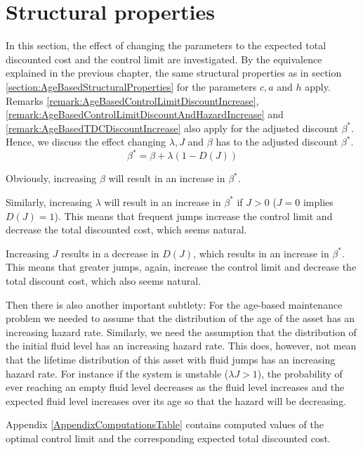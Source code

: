 \section{Structural properties}\label{section:SimpleStructuralProperties}
In this section, the effect of changing the parameters to the expected total discounted cost and the control limit are investigated.
By the equivalence explained in the previous chapter, the same structural properties as in section \ref{section:AgeBasedStructuralProperties} for the parameters $c,a$ and $h$ apply.
Remarks \ref{remark:AgeBasedControlLimitDiscountIncrease}, \ref{remark:AgeBasedControlLimitDiscountAndHazardIncrease} and \ref{remark:AgeBasedTDCDiscountIncrease} also apply for the adjusted discount $\beta^*$.
Hence, we discuss the effect changing $\lambda,J$ and $\beta$ has to the adjusted discount $\beta^*$.
\[
\beta^*=\beta+\lambda(1-D(J))
\]
\begin{remark}
	Obviously, increasing $\beta$ will result in an increase in $\beta^*$.
\end{remark}
\begin{remark}
Similarly, increasing $\lambda$ will result in an increase in $\beta^*$ if $J>0$ ($J=0$ implies $D(J)=1$).
This means that frequent jumps increase the control limit and decrease the total discounted cost, which seems natural.
\end{remark}
\begin{remark}
	Increasing $J$ results in a decrease in $D(J)$, which results in an increase in $\beta^*$.
	This means that greater jumps, again, increase the control limit and decrease the total discount cost, which also seems natural.
\end{remark}
Then there is also another important subtlety: For the age-based maintenance problem we needed to assume that the distribution of the age of the asset has an increasing hazard rate.
Similarly, we need the assumption that the distribution of the initial fluid level has an increasing hazard rate.
This does, however, not mean that the lifetime distribution of this asset with fluid jumps has an increasing hazard rate.
For instance if the system is unstable ($\lambda J>1$), the probability of ever reaching an empty fluid level decreases as the fluid level increases and the expected fluid level increases over its age so that the hazard will be decreasing.

Appendix \ref{AppendixComputationsTable} contains computed values of the optimal control limit and the corresponding expected total discounted cost.